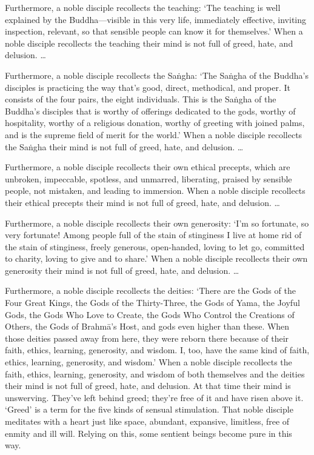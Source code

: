 \documentclass[12pt,openany]{book}%
\begin{document}
Furthermore, a noble disciple recollects the teaching: ‘The teaching is well explained by the Buddha—visible in this very life, immediately effective, inviting inspection, relevant, so that sensible people can know it for themselves.’ When a noble disciple recollects the teaching their mind is not full of greed, hate, and delusion. … 

Furthermore, a noble disciple recollects the \textsanskrit{Saṅgha}: ‘The \textsanskrit{Saṅgha} of the Buddha’s disciples is practicing the way that’s good, direct, methodical, and proper. It consists of the four pairs, the eight individuals. This is the \textsanskrit{Saṅgha} of the Buddha’s disciples that is worthy of offerings dedicated to the gods, worthy of hospitality, worthy of a religious donation, worthy of greeting with joined palms, and is the supreme field of merit for the world.’ When a noble disciple recollects the \textsanskrit{Saṅgha} their mind is not full of greed, hate, and delusion. … 

Furthermore, a noble disciple recollects their own ethical precepts, which are unbroken, impeccable, spotless, and unmarred, liberating, praised by sensible people, not mistaken, and leading to immersion. When a noble disciple recollects their ethical precepts their mind is not full of greed, hate, and delusion. … 

Furthermore, a noble disciple recollects their own generosity: ‘I’m so fortunate, so very fortunate! Among people full of the stain of stinginess I live at home rid of the stain of stinginess, freely generous, open-handed, loving to let go, committed to charity, loving to give and to share.’ When a noble disciple recollects their own generosity their mind is not full of greed, hate, and delusion. … 

Furthermore, a noble disciple recollects the deities: ‘There are the Gods of the Four Great Kings, the Gods of the Thirty-Three, the Gods of Yama, the Joyful Gods, the Gods Who Love to Create, the Gods Who Control the Creations of Others, the Gods of \textsanskrit{Brahmā}’s Host, and gods even higher than these. When those deities passed away from here, they were reborn there because of their faith, ethics, learning, generosity, and wisdom. I, too, have the same kind of faith, ethics, learning, generosity, and wisdom.’ When a noble disciple recollects the faith, ethics, learning, generosity, and wisdom of both themselves and the deities their mind is not full of greed, hate, and delusion. At that time their mind is unswerving. They’ve left behind greed; they’re free of it and have risen above it. ‘Greed’ is a term for the five kinds of sensual stimulation. That noble disciple meditates with a heart just like space, abundant, expansive, limitless, free of enmity and ill will. Relying on this, some sentient beings become pure in this way. 
\end{document}
